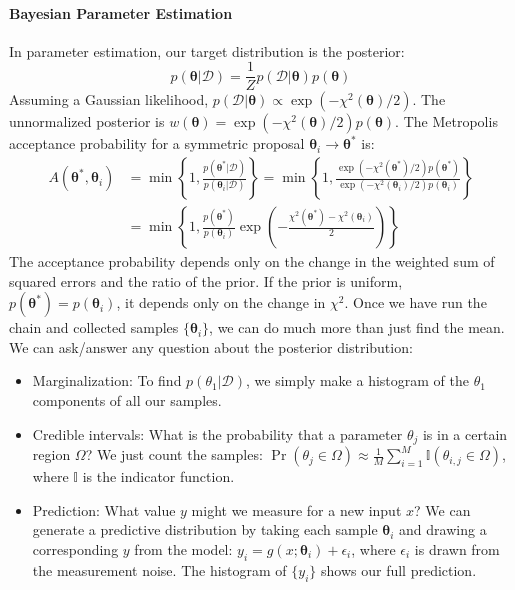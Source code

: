 \paragraph*{Bayesian Parameter Estimation}
In parameter estimation, our target distribution is the posterior:
\begin{equation}
    p(\boldsymbol{\theta}|\mathcal{D}) = \frac{1}{Z} p(\mathcal{D}|\boldsymbol{\theta}) p(\boldsymbol{\theta})
\end{equation}
Assuming a Gaussian likelihood, $p(\mathcal{D}|\boldsymbol{\theta}) \propto \exp(-\chi^2(\boldsymbol{\theta})/2)$. The unnormalized posterior is $w(\boldsymbol{\theta}) = \exp(-\chi^2(\boldsymbol{\theta})/2) p(\boldsymbol{\theta})$.
The Metropolis acceptance probability for a symmetric proposal $\boldsymbol{\theta}_i \to \boldsymbol{\theta}^*$ is:
\begin{align}
    A(\boldsymbol{\theta}^*, \boldsymbol{\theta}_i) &= \min \left\{ 1, \frac{p(\boldsymbol{\theta}^*|\mathcal{D})}{p(\boldsymbol{\theta}_i|\mathcal{D})} \right\}
    = \min \left\{ 1, \frac{\exp(-\chi^2(\boldsymbol{\theta}^*)/2) p(\boldsymbol{\theta}^*)}{\exp(-\chi^2(\boldsymbol{\theta}_i)/2) p(\boldsymbol{\theta}_i)} \right\} \\
    &= \min \left\{ 1, \frac{p(\boldsymbol{\theta}^*)}{p(\boldsymbol{\theta}_i)} \exp\left(-\frac{\chi^2(\boldsymbol{\theta}^*) - \chi^2(\boldsymbol{\theta}_i)}{2}\right) \right\}
\end{align}
The acceptance probability depends only on the change in the weighted sum of squared errors and the ratio of the prior. If the prior is uniform, $p(\boldsymbol{\theta}^*) = p(\boldsymbol{\theta}_i)$, it depends only on the change in $\chi^2$. Once we have run the chain and collected samples $\{\boldsymbol{\theta}_i\}$, we can do much more than just find the mean. We can ask/answer any question about the posterior distribution:
\begin{itemize}
    \item Marginalization: To find $p(\theta_1|\mathcal{D})$, we simply make a histogram of the $\theta_1$ components of all our samples.
    \item Credible intervals: What is the probability that a parameter $\theta_j$ is in a certain region $\Omega$? We just count the samples: $\Pr(\theta_j \in \Omega) \approx \frac{1}{M} \sum_{i=1}^M \mathbb{I}(\theta_{i,j} \in \Omega)$, where $\mathbb{I}$ is the indicator function.
    \item Prediction: What value $y$ might we measure for a new input $x$? We can generate a predictive distribution by taking each sample $\boldsymbol{\theta}_i$ and drawing a corresponding $y$ from the model: $y_i = g(x; \boldsymbol{\theta}_i) + \epsilon_i$, where $\epsilon_i$ is drawn from the measurement noise. The histogram of $\{y_i\}$ shows our full prediction.
\end{itemize}

